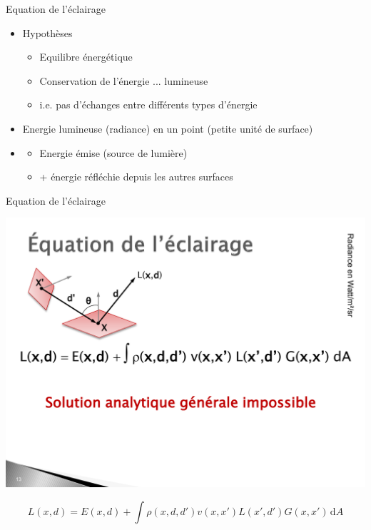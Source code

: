 \begin{frame}{Equation de l'éclairage}
    \begin{itemize}
        \item Hypothèses 
        \begin{itemize}
            \item Equilibre énergétique 
            \item Conservation de l'énergie ... lumineuse 
            \item i.e. pas d'échanges entre différents types d'énergie 
        \end{itemize}
        \item Energie lumineuse (radiance) en un point (petite unité de surface)
        \item \begin{itemize}
            \item Energie émise (source de lumière)
            \item + énergie réfléchie depuis les autres surfaces
        \end{itemize}
    \end{itemize}
\end{frame}

\begin{frame}{Equation de l'éclairage}
\begin{center}
    \includegraphics[width=.5\textwidth]{figs/eq-eclairage.pdf}
\end{center}

    $$
    L(x,d) = E(x,d) + \int \rho(x,d,d')v(x,x')L(x',d')G(x,x')  \,\mathrm{d}A 
    $$

\end{frame}



